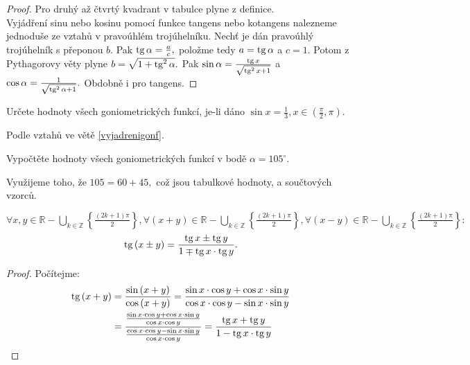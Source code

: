 \begin{proof}
    Pro druhý až čtvrtý kvadrant v tabulce plyne z definice. \\
    Vyjádření sinu nebo kosinu pomocí funkce tangens nebo kotangens nalezneme
    jednoduše ze vztahů v pravoúhlém trojúhelníku. Nechť je dán pravoúhlý trojúhelník
    s přeponou $b.$ Pak $\operatorname{tg} \alpha = \frac{a}{c},$ položme tedy $a = \operatorname{tg} \alpha$ a $c=1. $
    Potom z Pythagorovy věty plyne $b=\sqrt{1+\operatorname{tg}^2 \alpha}. $ Pak $\sin\alpha = \frac{\operatorname{tg} x}{\sqrt{\operatorname{tg}^2 x+1} }$ a
    $\cos \alpha = \frac{1}{\sqrt{\operatorname{tg}^2 \alpha + 1} }.$ Obdobně i pro tangens.
\end{proof}

\begin{priklad}
Určete hodnoty všech goniometrických funkcí, je-li dáno $\sin x=\frac{1}{3}, x \in \left ( \frac{\pi}{2},\pi \right ). $
\end{priklad}

\begin{reseni}
Podle vztahů ve větě \ref{vyjadrenigonf}.
\end{reseni}

\begin{priklad}
Vypočtěte hodnoty všech goniometrických funkcí v bodě $\alpha = 105^\circ$.
\end{priklad}

\begin{reseni}
Využijeme toho, že $105=60+45,$ což jsou tabulkové hodnoty, a součtových vzorců.
\end{reseni}

\begin{veta}
  $\forall x,y\in\mathbb{R}-\bigcup\limits_{k\in\mathbb{Z}} \left\{\frac{(2k+1)\pi}{2}\right\}, \forall (x+y) \in \mathbb{R}-\bigcup\limits_{k\in\mathbb{Z}} \left\{\frac{(2k+1)\pi}{2}\right\}, \forall (x-y) \in \mathbb{R}-\bigcup\limits_{k\in\mathbb{Z}} \left\{\frac{(2k+1)\pi}{2}\right\}:$
  $$\operatorname{tg}\left(x\pm y\right) = \frac{\operatorname{tg} x \pm \operatorname{tg} y}{1\mp\operatorname{tg} x \cdot \operatorname{tg} y}.$$
\end{veta}
\begin{proof}
    Počítejme:
    \begin{align*}
        \operatorname{tg} \left(x+y\right) & = \frac{\sin \left(x+y\right)}{\cos \left(x+y\right)}=\frac{\sin x\cdot  \cos y + \cos x\cdot  \sin y}{\cos x \cdot \cos y - \sin x\cdot  \sin y} \\
        & = \frac{\frac{\sin x \cdot \cos y + \cos x\cdot  \sin y}{\cos x \cdot \cos y}}{\frac{\cos x\cdot  \cos y - \sin x \cdot \sin y}{\cos x\cdot  \cos y}}=\frac{\operatorname{tg} x + \operatorname{tg} y}{1-\operatorname{tg} x \cdot \operatorname{tg} y}\qedhere
    \end{align*}
\end{proof}


